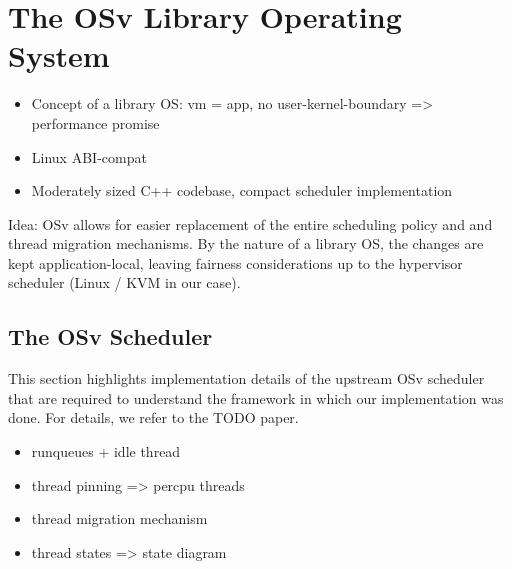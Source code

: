 \documentclass[12pt,a4paper]{book}
\begin{document}
\section{The OSv Library Operating System}\label{ch:di:osv}
%

\begin{itemize}
    \item Concept of a library OS: vm = app, no user-kernel-boundary => performance promise
    \item Linux ABI-compat
    \item Moderately sized C++ codebase, compact scheduler implementation
\end{itemize}
Idea: OSv allows for easier replacement of the entire scheduling policy and and thread migration mechanisms.
By the nature of a library OS, the changes are kept application-local, leaving fairness considerations up to the hypervisor scheduler (Linux / KVM in our case).

\subsection{The OSv Scheduler}
This section highlights implementation details of the upstream OSv scheduler that are required to understand the framework in which our implementation was done.
For details, we refer to the TODO paper.
\begin{itemize}
    \item runqueues + idle thread
    \item thread pinning => percpu threads
    \item thread migration mechanism
    \item thread states => state diagram
\end{itemize}
\end{document}
